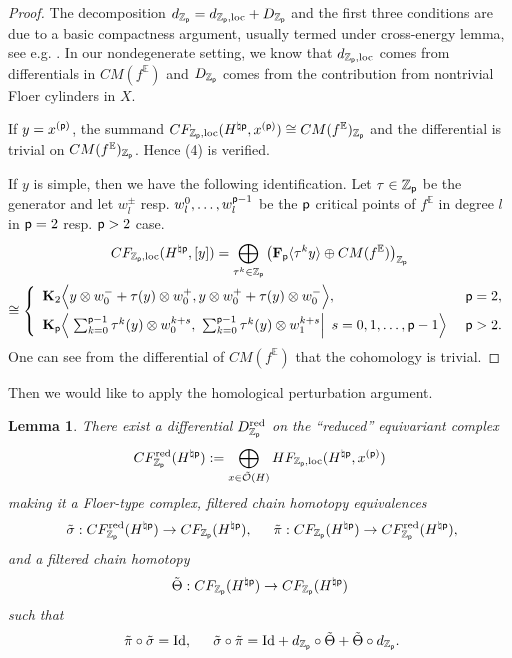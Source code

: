 \documentclass[reqno, 10pt]{amsart}
\numberwithin{equation}{section}
\numberwithin{equation}{section}
\newtheorem{lemma}[thm]{Lemma}
\theoremstyle{definition}
\theoremstyle{remark}
\newcommand{\beqn}{\begin{equation*}}
\newcommand{\eeqn}{\end{equation*}}
\newcommand{\mb}{\mathbb}
\newcommand{\mc}{\mathcal}
\newcommand{\p}{{\sf p}}
\newcommand{\fp}{{\bf F}_{\sf p}}
\newcommand{\kp}{{\bf K}_{\sf p}}
\newcommand{\zp}{{{\mb Z}_{\sf p}}}
\newcommand{\ep}{{{\mathbb E}}}
\begin{document}
\begin{proof}
The decomposition $d_{\zp} = d_{\zp, {\rm loc}} + D_{\zp}$ and the first three conditions are due to a basic compactness argument, usually termed under cross-energy lemma, see e.g. \cite[Lemma B.1]{BSWX}. In our nondegenerate setting, we know that $d_{\zp, {\rm loc}}$ comes from differentials in $CM(f^\ep)$ and $D_{\zp}$ comes from the contribution from nontrivial Floer cylinders in $X$.

If $y = x^{(\p)}$, the summand $CF_{\zp, {\rm loc}}(H^{\natural\p}, x^{(\p)}) \cong CM(f^\ep)_{\zp}$ and the differential is trivial on $CM(f^\ep)_{\zp}$. Hence (4) is verified.

If $y$ is simple, then we have the following identification. Let $\tau \in \zp$ be the generator and let $w_l^\pm$ resp. $w_l^0, \ldots, w_l^{\p-1}$ be the $\p$ critical points of $f^\ep$ in degree $l$ in $\p=2$ resp. $\p>2$ case. 
\begin{multline*}
CF_{\zp, {\rm loc}}(H^{\natural \p}, [y]) = \bigoplus_{\tau^k \in \zp} \left( \fp \langle \tau^k y \rangle \oplus CM(f^\ep) \right)_{\zp} \\
\cong \left\{ \begin{array}{ll}  {\bf K}_2  \Big\langle y \otimes w_0^- + \tau(y) \otimes w_0^+, y \otimes w_0^+ + \tau(y) \otimes w_0^-  \Big\rangle  ,\ &\ \p = 2,\\[0.2cm]
\kp \Big\langle \left. \sum_{k=0}^{\p-1} \tau^k(y) \otimes w_0^{k+s},\ \sum_{k=0}^{\p-1} \tau^k(y) \otimes w_1^{k+s}\right|\ s = 0, 1, \ldots, \p-1 \Big\rangle &\ \p>2.
\end{array}\right.
\end{multline*}
One can see from the differential of $CM(f^\ep)$ that the cohomology is trivial.
\end{proof}

Then we would like to apply the homological perturbation argument.

\begin{lemma}\label{lemma_reduced_complex}
There exist a differential $D_{\zp}^{\rm red}$ on the ``reduced'' equivariant complex
\beqn
CF_{\zp}^{\rm red}(H^{\natural \p}):= \bigoplus_{x \in \tilde {\mc O}(H)} HF_{\zp, {\rm loc}}(H^{\natural \p}, x^{(\p)}) 
\eeqn
making it a Floer-type complex, filtered chain homotopy equivalences
\begin{align*}
&\ \tilde \sigma: CF_{\zp}^{\rm red}(H^{\natural \p}) \to CF_{\zp}(H^{\natural \p}),\ &\ \tilde \pi: CF_{\zp}(H^{\natural \p}) \to CF_{\zp}^{\rm red}(H^{\natural \p}),
\end{align*}
and a filtered chain homotopy
\beqn
\tilde \Theta: CF_{\zp}(H^{\natural\p}) \to CF_{\zp}(H^{\natural \p}) 
\eeqn
such that 
\begin{align*}
&\ \tilde \pi \circ \tilde \sigma = {\rm Id},\ &\ \tilde \sigma \circ \tilde \pi = {\rm Id} + d_{\zp} \circ \tilde \Theta + \tilde\Theta \circ d_{\zp}.
\end{align*}
\end{lemma}
\end{document}
